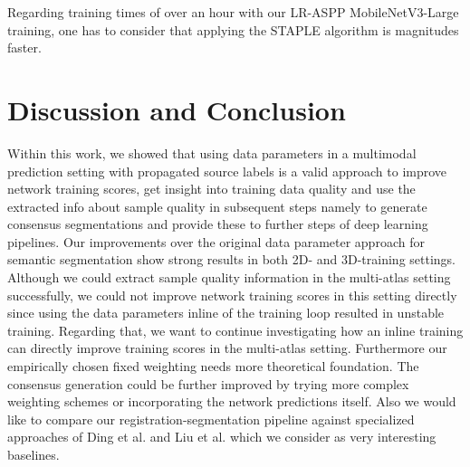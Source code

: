     Regarding training times of over an hour with our LR-ASPP MobileNetV3-Large training, one has to consider that applying the STAPLE algorithm is magnitudes faster.

\section{Discussion and Conclusion}
    \label{sec:conclusion}
    Within this work, we showed that using data parameters in a multimodal prediction setting with propagated source labels is a valid approach to improve network training scores, get insight into training data quality and use the extracted info about sample quality in subsequent steps namely to generate consensus segmentations and provide these to further steps of deep learning pipelines. Our improvements over the original data parameter approach for semantic segmentation show strong results in both 2D- and 3D-training settings. Although we could extract sample quality information in the multi-atlas setting successfully, we could not improve network training scores in this setting directly since using the data parameters inline of the training loop resulted in unstable training.
    Regarding that, we want to continue investigating how an inline training can directly improve training scores in the multi-atlas setting. Furthermore our empirically chosen fixed weighting needs more theoretical foundation. The consensus generation could be further improved by trying more complex weighting schemes or incorporating the network predictions itself. Also we would like to compare our registration-segmentation pipeline against specialized approaches of Ding et al. and Liu et al. \cite{ding2019votenet,ding2020votenet+,liu2021style} which we consider as very interesting baselines.
